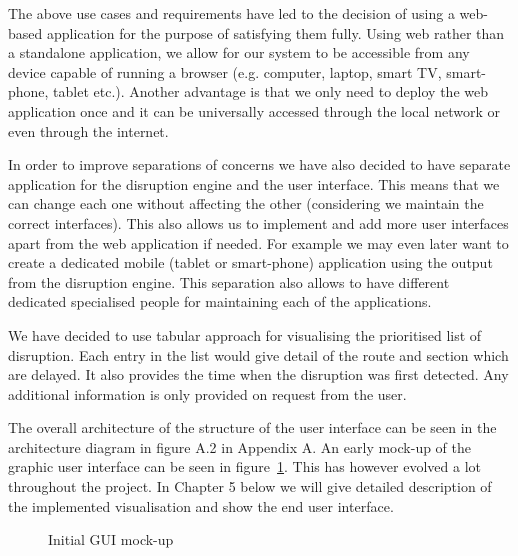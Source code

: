 The above use cases and requirements have led to the decision of using a web-based application for the purpose of satisfying them fully. Using web rather than a standalone application, we allow for our system to be accessible from any device capable of running a browser (e.g. computer, laptop, smart TV, smart-phone, tablet etc.). Another advantage is that we only need to deploy the web application once and it can be universally accessed through the local network or even through the internet.

In order to improve separations of concerns we have also decided to have separate application for the disruption engine and the user interface. This means that we can change each one without affecting the other (considering we maintain the correct interfaces). This also allows us to implement and add more user interfaces apart from the web application if needed. For example we may even later want to create a dedicated mobile (tablet or smart-phone) application using the output from the disruption engine. This separation also allows to have different dedicated specialised people for maintaining each of the applications.

We have decided to use tabular approach for visualising the prioritised list of disruption. Each entry in the list would give detail of the route and section which are delayed. It also provides the time when the disruption was first detected. Any additional information is only provided on request from the user.

The overall architecture of the structure of the user interface can be seen in the architecture diagram in figure A.2 in Appendix A. An early mock-up of the graphic user interface can be seen in figure~\ref{fig:guiProposal}. This has however evolved a lot throughout the project. In Chapter 5 below we will give detailed description of the implemented visualisation and show the end user interface.


\begin{figure}[ht]
	\caption{Initial GUI mock-up}
	\label{fig:guiProposal}
\end{figure}